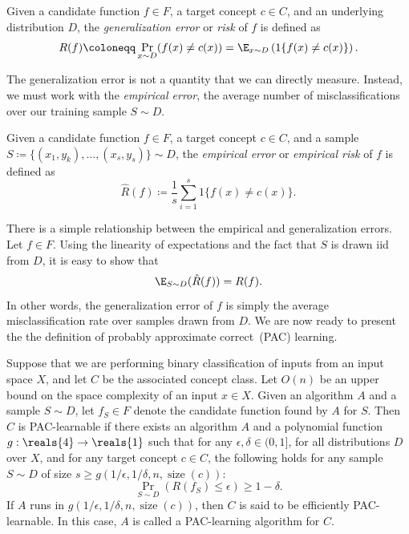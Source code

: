 \documentclass[11pt,a4paper]{article}
\numberwithin{equation}{section}
\newcommand{\ind}[1]{1\{#1\}}
\newcommand{\size}{\operatorname{size}}
\begin{document}
\begin{definition}
Given a candidate function $f \in F$, a target concept $c \in C$, and an
underlying distribution $D$, the \emph{generalization error} or \emph{risk} of
$f$ is defined as
\[
	R(f) \coloneqq \Pr_{x \sim D}(f(x) \neq c(x)) =
		\E_{x \sim D} \left(\ind{f(x) \neq c(x)}\right).
\]
\end{definition}

The generalization error is not a quantity that we can directly measure.
Instead, we must work with the \emph{empirical error}, the average number of
misclassifications over our training sample $S \sim D$.

\begin{definition}
Given a candidate function $f \in F$, a target concept $c \in C$, and a sample
$S \coloneqq \{(x_1, y_k), \ldots, (x_s, y_s)\} \sim D$, the \emph{empirical
error} or \emph{empirical risk} of $f$ is defined as
\[
	\hat{R}(f) \coloneqq \frac{1}{s} \sum_{i = 1}^s \ind{f(x) \neq c(x)}.
\]
\end{definition}

There is a simple relationship between the empirical and generalization errors.
Let $f \in F$.  Using the linearity of expectations and the fact that $S$ is
drawn iid from $D$, it is easy to show that
\[
	\E_{S \sim D} (\hat{R}(f)) = R(f).
\]
In other words, the generalization error of $f$ is simply the average
misclassification rate over samples drawn from $D$. We are now ready to present
the the definition of probably approximate correct~(PAC) learning.

\begin{definition}
Suppose that we are performing binary classification of inputs from an input
space $X$, and let $C$ be the associated concept class. Let $O(n)$ be an upper
bound on the space complexity of an input $x \in X$. Given an algorithm $A$ and
a sample $S \sim D$, let $f_S \in F$ denote the candidate function found by $A$
for $S$. Then $C$ is PAC-learnable if there exists an algorithm $A$ and a
polynomial function $g : \reals{4} \to \reals{1}$ such that for any $\epsilon,
\delta \in (0, 1]$, for all distributions $D$ over $X$, and for any target
concept $c \in C$, the following holds for any sample $S \sim D$ of size $s \geq
g(1/\epsilon, 1/\delta, n, \size(c))$:
\[
	\Pr_{S \sim D} (R(f_S) \leq \epsilon) \geq 1 - \delta.
\]
If $A$ runs in $g(1/\epsilon, 1/\delta, n, \size(c))$, then $C$ is said to be
efficiently PAC-learnable. In this case, $A$ is called a PAC-learning algorithm
for $C$.
\end{definition}
\end{document}
